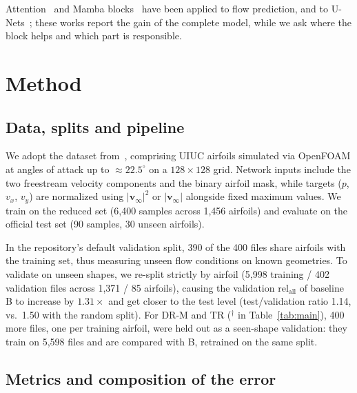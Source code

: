 \documentclass[conference]{IEEEtran}
\newcommand{\B}{B}                                  %
\newcommand{\DR}{DR-M}                              %
\newcommand{\TR}{TR}                                %
\newcommand{\relall}{$\mathrm{rel}_{\mathrm{all}}$}
\begin{document}
Attention~\cite{li2023hydrofoil,zhou2023tnn} and Mamba
blocks~\cite{cheng2024mno,zhang2026aeromamba} have been applied to flow
prediction, and to U-Nets~\cite{ma2024umamba}; these works report the gain of
the complete model, while we ask where the block helps and which part is
responsible.

\section{Method}

\subsection{Data, splits and pipeline}
\label{sec:data}

We adopt the dataset from~\cite{thuerey2020}, comprising UIUC airfoils
simulated via OpenFOAM at angles of attack up to $\approx 22.5^\circ$ on a
$128\times128$ grid. Network inputs include the two freestream velocity
components and the binary airfoil mask, while targets ($p$, $v_x$, $v_y$) are
normalized using $|\mathbf{v}_\infty|^2$ or $|\mathbf{v}_\infty|$ alongside
fixed maximum values. We train on the reduced set (6,400 samples across 1,456
airfoils) and evaluate on the official test set (90 samples, 30 unseen
airfoils). 

In the repository's default validation split, 390 of the 400 files
share airfoils with the training set, thus measuring unseen flow conditions on
known geometries. To validate on unseen shapes, we re-split strictly by
airfoil (5,998 training / 402 validation files across 1,371 / 85 airfoils), causing the validation \relall{} of baseline \B{} to increase by $1.31\times$ and get closer to the test level (test/validation ratio 1.14, vs.\ 1.50 with the random split).
For \DR{} and \TR{} ($^{\dagger}$ in Table~\ref{tab:main}), 400 more files, one
per training airfoil, were held out as a seen-shape validation: they train on
5,598 files and are compared with \B{}, retrained on the same split.

\subsection{Metrics and composition of the error}
\label{sec:metrics}
\end{document}
